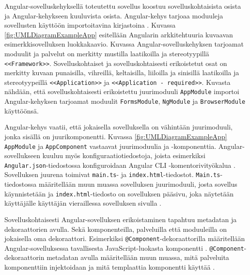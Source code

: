 \documentclass[finnish]{tktltiki2}
\theoremstyle{definition}
\theoremstyle{remark}
\numberwithin{figure}{section}
\begin{document}
Angular-sovelluskehyksellä toteutettu sovellus koostuu sovelluskohtaisista osista ja Angular-kehykseen kuuluvista osista. Angular-kehys tarjoaa moduuleja sovellusten käyttöön importoitavina kirjastoina \cite{NgModules}. Kuvassa \ref{fig:UMLDiagramExampleApp} esitellään Angularin arkkitehtuuria kuvaavan esimerkkisovelluksen \cite{ExampleApplication} luokkakaavio. Kuvassa Angular-sovelluskehyksen tarjoamat moduulit ja palvelut on merkitty mustilla laatikoilla ja stereotyypillä \texttt{<<Framework>>}. Sovelluskohtaiset ja sovelluskohtaisesti erikoistetut osat on merkitty kuvaan punaisilla, vihreillä, keltaisilla, liiloilla ja sinisillä laatikoilla ja stereotyypeillä \texttt{<<Application>>} ja \texttt{<<Application - required>>}. Kuvasta nähdään, että sovelluskohtaisesti erikoistettu juurimoduuli \texttt{AppModule} importoi Angular-kehyksen tarjoamat moduulit \texttt{FormsModule}, \texttt{NgModule} ja \texttt{BrowserModule} käyttöönsä.

Angular-kehys vaatii, että jokaisella sovelluksella on vähintään juurimoduuli, jonka sisällä on juurikomponentti. Kuvassa \ref{fig:UMLDiagramExampleApp} \texttt{AppModule} ja \texttt{AppComponent} vastaavat juurimoduulia ja -komponenttia. Angular-sovellukseen kuuluu myös konfiguraatiotiedostoja, joista esimerkiksi \texttt{Angular.json}-tiedostossa konfiguroidaan Angular CLI -komentorivityökalua \cite{QuickStart}. Sovelluksen juurena toimivat \texttt{main.ts}- ja \texttt{index.html}-tiedostot. \texttt{Main.ts}-tiedostossa määritellään muun muassa sovelluksen juurimoduuli, josta sovellus käynnistetään ja \texttt{index.html}-tiedosto on sovelluksen pääsivu, joka näytetään käyttäjälle käyttäjän vieraillessa sovelluksen sivulla \cite{QuickStart}.

Sovelluskohtaisesti Angular-sovelluksen erikoistaminen tapahtuu metadatan ja dekoraattorien avulla. Sekä komponenteilla, palveluilla että moduuleilla on jokaisella oma dekoraattori. Esimerkiksi \texttt{@Component}-dekoraattorilla määritellään Angular-sovelluksessa tavallisesta JavaScript-luokasta komponentti \cite{ArchitectureComponents}. \texttt{@Component}-dekoraattorin metadatan avulla määritellään muun muassa, mitä palveluita komponenttiin injektoidaan ja mitä templaattia komponentti käyttää \cite{ArchitectureComponents}. 
\end{document}
